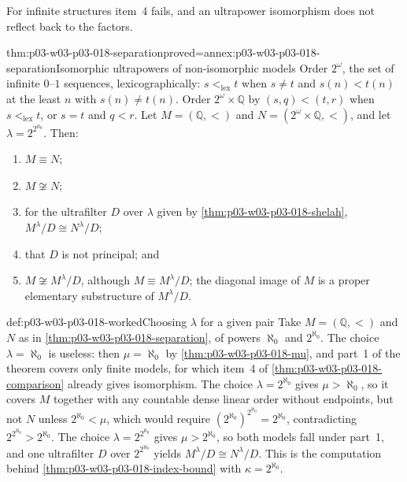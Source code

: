 For infinite structures item~4 fails, and an ultrapower isomorphism does not
reflect back to the factors.

\begin{hbcorollary}{thm:p03-w03-p03-018-separation}{proved=annex:p03-w03-p03-018-separation}{Isomorphic ultrapowers of non-isomorphic models}
Order \(2^\omega\), the set of infinite \(0\)--\(1\) sequences,
lexicographically: \(s<_{\mathrm{lex}}t\) when \(s\ne t\) and
\(s(n)<t(n)\) at the least \(n\) with \(s(n)\ne t(n)\).  Order
\(2^\omega\times\mathbb Q\) by \((s,q)<(t,r)\) when \(s<_{\mathrm{lex}}t\),
or \(s=t\) and \(q<r\).  Let \(M=(\mathbb Q,<)\) and
\(N=(2^\omega\times\mathbb Q,<)\), and let \(\lambda=2^{2^{\aleph_0}}\).
Then:
\begin{enumerate}
  \item \(M\equiv N\);
  \item \(M\not\cong N\);
  \item for the ultrafilter \(D\) over \(\lambda\) given by
        \cref{thm:p03-w03-p03-018-shelah}, \(M^\lambda/D\cong N^\lambda/D\);
  \item that \(D\) is not principal; and
  \item \(M\not\cong M^\lambda/D\), although \(M\equiv M^\lambda/D\); the
        diagonal image of \(M\) is a proper elementary substructure of
        \(M^\lambda/D\).
\end{enumerate}
\end{hbcorollary}

\begin{hbexample}{def:p03-w03-p03-018-worked}{Choosing \(\lambda\) for a given pair}
Take \(M=(\mathbb Q,<)\) and \(N\) as in
\cref{thm:p03-w03-p03-018-separation}, of powers \(\aleph_0\) and
\(2^{\aleph_0}\).  The choice \(\lambda=\aleph_0\) is useless: then
\(\mu=\aleph_0\) by \cref{thm:p03-w03-p03-018-mu}, and part~1 of the theorem
covers only finite models, for which item~4 of
\cref{thm:p03-w03-p03-018-comparison} already gives isomorphism.  The choice
\(\lambda=2^{\aleph_0}\) gives \(\mu>\aleph_0\), so it covers \(M\) together
with any countable dense linear order without endpoints, but not \(N\)
unless \(2^{\aleph_0}<\mu\), which would require
\((2^{\aleph_0})^{2^{\aleph_0}}=2^{\aleph_0}\), contradicting
\(2^{2^{\aleph_0}}>2^{\aleph_0}\).  The choice
\(\lambda=2^{2^{\aleph_0}}\) gives \(\mu>2^{\aleph_0}\), so both models fall
under part~1, and one ultrafilter \(D\) over \(2^{2^{\aleph_0}}\) yields
\(M^\lambda/D\cong N^\lambda/D\).  This is the computation behind
\cref{thm:p03-w03-p03-018-index-bound} with \(\kappa=2^{\aleph_0}\).
\end{hbexample}

